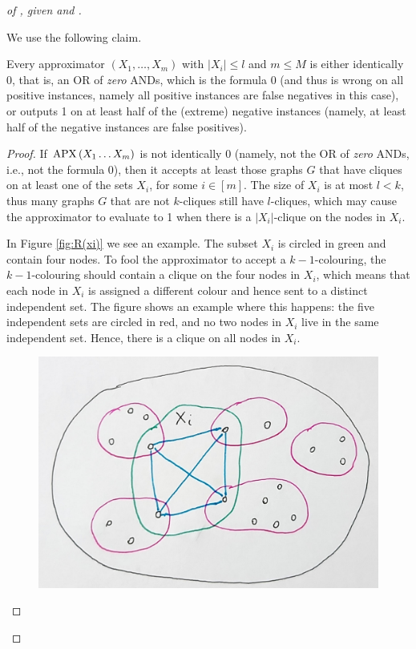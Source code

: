 \bigskip









\begin{proof}[of , given   and ]
\

We use the following claim. 

\begin{claim}\label{cla:internal-in-monotone-lower-bound}
 Every approximator  \APPX$\left(X_1, \ldots, X_m\right)$ with 
  $\left|X_i\right| \leq l$ and $m \leq M$ is either identically 0, that is, an OR of \emph{zero} ANDs, which is the formula $0$ (and thus is wrong on all positive instances, namely all positive instances are false negatives in this case), or outputs 1 on at least half of the (extreme) negative instances (namely, at least half of the negative instances are false positives).

\end{claim}
\begin{proof}
If $\operatorname{\mathrm{APX}}\left(X_1 \ldots X_m\right)$ is not identically 0 (namely, not the OR of \emph{zero} ANDs, i.e., not the formula $0$), then it accepts at least those graphs $G$ that have cliques on at least one of the sets $X_i$, for some $i\in[m]$. The size of $X_i$ is at most $ l<k$, thus many graphs $G$ that are not $k$-cliques still have $l$-cliques, which may cause the approximator to evaluate to 1 when there is a $|X_i|$-clique on the nodes in $X_i$.


In Figure \ref{fig:R(xi)}  we see an example. The subset $X_i$ is circled in green and contain four nodes. To fool the approximator to accept a $k-1$-colouring, the $k-1$-colouring should contain a clique on the four nodes in $X_i$, which means that each node in $X_i$ is assigned a different colour and hence sent to a distinct independent set. The figure shows an example where this happens: the five independent sets are circled in red, and no two nodes in $X_i$ live in the same independent set. Hence, there is a clique on all nodes in $X_i$.
\begin{figure}[H] 
    \centering
    \includegraphics[scale=0.5]{images/R(Xi)-lemma-cliques.png}


\end{figure}
\end{proof}
\end{proof}
